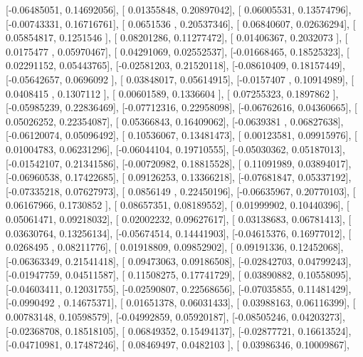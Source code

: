 \documentclass{article}
\begin{document}
       [-0.06485051,  0.14692056],
       [ 0.01355848,  0.20897042],
       [ 0.06005531,  0.13574796],
       [-0.00743331,  0.16716761],
       [ 0.0651536 ,  0.20537346],
       [ 0.06840607,  0.02636294],
       [ 0.05854817,  0.1251546 ],
       [ 0.08201286,  0.11277472],
       [ 0.01406367,  0.2032073 ],
       [ 0.0175477 ,  0.05970467],
       [ 0.04291069,  0.02552537],
       [-0.01668465,  0.18525323],
       [ 0.02291152,  0.05443765],
       [-0.02581203,  0.21520118],
       [-0.08610409,  0.18157449],
       [-0.05642657,  0.0696092 ],
       [ 0.03848017,  0.05614915],
       [-0.0157407 ,  0.10914989],
       [ 0.0408415 ,  0.1307112 ],
       [ 0.00601589,  0.1336604 ],
       [ 0.07255323,  0.1897862 ],
       [-0.05985239,  0.22836469],
       [-0.07712316,  0.22958098],
       [-0.06762616,  0.04360665],
       [ 0.05026252,  0.22354087],
       [ 0.05366843,  0.16409062],
       [-0.0639381 ,  0.06827638],
       [-0.06120074,  0.05096492],
       [ 0.10536067,  0.13481473],
       [ 0.00123581,  0.09915976],
       [ 0.01004783,  0.06231296],
       [-0.06044104,  0.19710555],
       [-0.05030362,  0.05187013],
       [-0.01542107,  0.21341586],
       [-0.00720982,  0.18815528],
       [ 0.11091989,  0.03894017],
       [-0.06960538,  0.17422685],
       [ 0.09126253,  0.13366218],
       [-0.07681847,  0.05337192],
       [-0.07335218,  0.07627973],
       [ 0.0856149 ,  0.22450196],
       [-0.06635967,  0.20770103],
       [ 0.06167966,  0.1730852 ],
       [ 0.08657351,  0.08189552],
       [ 0.01999902,  0.10440396],
       [ 0.05061471,  0.09218032],
       [ 0.02002232,  0.09627617],
       [ 0.03138683,  0.06781413],
       [ 0.03630764,  0.13256134],
       [-0.05674514,  0.14441903],
       [-0.04615376,  0.16977012],
       [ 0.0268495 ,  0.08211776],
       [ 0.01918809,  0.09852902],
       [ 0.09191336,  0.12452068],
       [-0.06363349,  0.21541418],
       [ 0.09473063,  0.09186508],
       [-0.02842703,  0.04799243],
       [-0.01947759,  0.04511587],
       [ 0.11508275,  0.17741729],
       [ 0.03890882,  0.10558095],
       [-0.04603411,  0.12031755],
       [-0.02590807,  0.22568656],
       [-0.07035855,  0.11481429],
       [-0.0990492 ,  0.14675371],
       [ 0.01651378,  0.06031433],
       [ 0.03988163,  0.06116399],
       [ 0.00783148,  0.10598579],
       [-0.04992859,  0.05920187],
       [-0.08505246,  0.04203273],
       [-0.02368708,  0.18518105],
       [ 0.06849352,  0.15494137],
       [-0.02877721,  0.16613524],
       [-0.04710981,  0.17487246],
       [ 0.08469497,  0.0482103 ],
       [ 0.03986346,  0.10009867],
\end{document}
